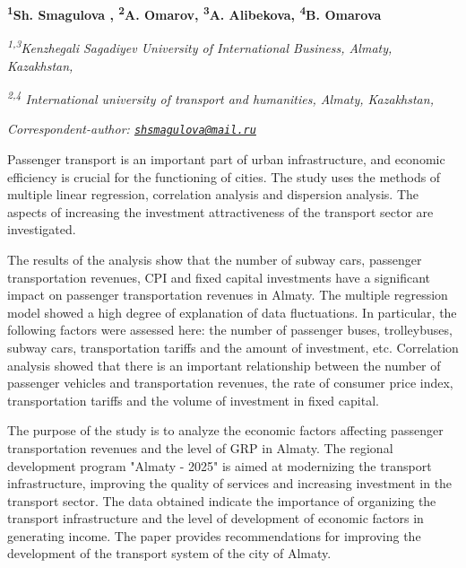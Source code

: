 
\begin{articleheader}

{\bfseries  
\textsuperscript{1}Sh. Smagulova\textsuperscript{\envelope } \authorid,
\textsuperscript{2}A. Omarov\authorid,
\textsuperscript{3}A. Alibekova\authorid,
\textsuperscript{4}B. Omarova\authorid}
\end{articleheader}

\begin{affiliation}
\textsuperscript{\emph{1,3}}\emph{Kenzhegali Sagadiyev University of International Business, Almaty, Kazakhstan,}

\emph{\textsuperscript{2,4} International university of transport and humanities, Almaty, Kazakhstan,}

\raggedright \textsuperscript{\envelope }{\em Correspondent-author: \href{mailto:shsmagulova@mail.ru}{\nolinkurl{shsmagulova@mail.ru}}}
\end{affiliation}

Passenger transport is an important part of urban infrastructure, and
economic efficiency is crucial for the functioning of cities. The study
uses the methods of multiple linear regression, correlation analysis and
dispersion analysis. The aspects of increasing the investment
attractiveness of the transport sector are investigated.

The results of the analysis show that the number of subway cars,
passenger transportation revenues, CPI and fixed capital investments
have a significant impact on passenger transportation revenues in
Almaty. The multiple regression model showed a high degree of
explanation of data fluctuations. In particular, the following factors
were assessed here: the number of passenger buses, trolleybuses, subway
cars, transportation tariffs and the amount of investment, etc.
Correlation analysis showed that there is an important relationship
between the number of passenger vehicles and transportation revenues,
the rate of consumer price index, transportation tariffs and the volume
of investment in fixed capital.

The purpose of the study is to analyze the economic factors affecting
passenger transportation revenues and the level of GRP in Almaty. The
regional development program "Almaty - 2025" is aimed at modernizing the
transport infrastructure, improving the quality of services and
increasing investment in the transport sector. The data obtained
indicate the importance of organizing the transport infrastructure and
the level of development of economic factors in generating income. The
paper provides recommendations for improving the development of the
transport system of the city of Almaty.

